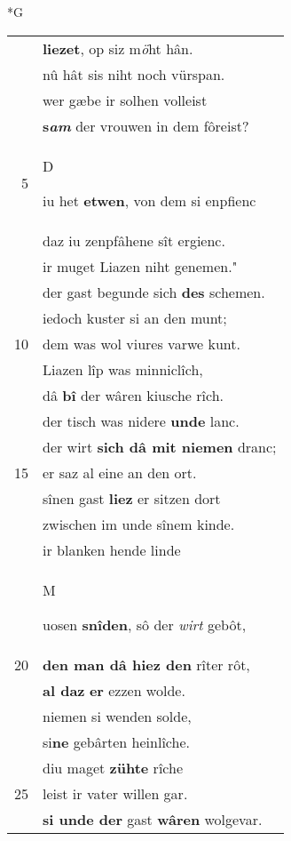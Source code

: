 \documentclass[8pt,a4paper,notitlepage]{article}
\begin{document}
\begin{table}[ht]
\begin{minipage}[t]{0.5\linewidth}
\small
\begin{center}*G
\end{center}
\begin{tabular}{rl}
 & \textbf{liezet}, op siz m\textit{ö}ht hân.\\ 
 & nû hât sis niht noch vürspan.\\ 
 & wer gæbe ir solhen volleist\\ 
 & \textbf{s\textit{am}} der vrouwen in dem fôreist?\\ 
5 & \begin{large}D\end{large}iu het \textbf{etwen}, von dem si enpfienc\\ 
 & daz iu zenpfâhene sît ergienc.\\ 
 & ir muget Liazen niht genemen."\\ 
 & der gast begunde sich \textbf{des} schemen.\\ 
 & iedoch kuster si an den munt;\\ 
10 & dem was wol viures varwe kunt.\\ 
 & Liazen lîp was minniclîch,\\ 
 & dâ \textbf{bî} der wâren kiusche rîch.\\ 
 & der tisch was nidere \textbf{unde} lanc.\\ 
 & der wirt \textbf{sich dâ mit niemen} dranc;\\ 
15 & er saz al eine an den ort.\\ 
 & sînen gast \textbf{liez} er sitzen dort\\ 
 & zwischen im unde sînem kinde.\\ 
 & ir blanken hende linde\\ 
 & \begin{large}M\end{large}uosen \textbf{snîden}, sô der \textit{wirt} gebôt,\\ 
20 & \textbf{den man dâ hiez den} rîter rôt,\\ 
 & \textbf{al daz} \textbf{er} ezzen wolde.\\ 
 & niemen si wenden solde,\\ 
 & si\textbf{ne} gebârten heinlîche.\\ 
 & diu maget \textbf{zühte} rîche\\ 
25 & leist ir vater willen gar.\\ 
 & \textbf{si unde der} gast \textbf{wâren} wolgevar.\\ 

\end{tabular}
\end{minipage}
\end{table}
\end{document}
